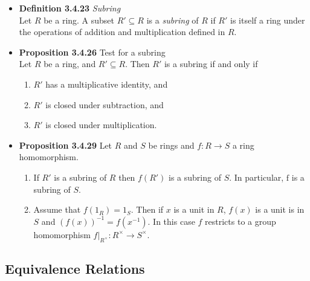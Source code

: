 \documentclass[11pt,a4paper]{article}
\begin{document}
\begin{itemize}
    \item \textbf{Definition 3.4.23} \emph{Subring} \\
        Let $R$ be a ring.
        A subset $R' \subseteq R$ is a \emph{subring} of $R$ if $R'$ is itself a ring under the
        operations of addition and multiplication defined in $R$.

    \item \textbf{Proposition 3.4.26} Test for a subring \\
        Let $R$ be a ring, and $R' \subseteq R$.
        Then $R'$ is a subring if and only if
        \begin{enumerate}
            \item $R'$ has a multiplicative identity, and
            \item $R'$ is closed under subtraction, and
            \item $R'$ is closed under multiplication.
        \end{enumerate}

    \item \textbf{Proposition 3.4.29} Let $R$ and $S$ be rings and $f : R \to S$
        a ring homomorphism.
        \begin{enumerate}
            \item If $R'$ is a subring of $R$ then $f(R')$ is a subring of $S$.
                In particular, $\mathrm{f}$ is a subring of $S$.
            \item Assume that $f(1_R) = 1_S$.
                Then if $x$ is a unit in $R$, $f(x)$ is a unit is in $S$ and
                ${(f(x))}^{-1} = f{(x^{-1})}$.
                In this case $f$ restricts to a group homomorphism
                $f|_{R^\times} : R^\times \to S^\times$.
        \end{enumerate}
\end{itemize}

\subsection{Equivalence Relations}
\end{document}
